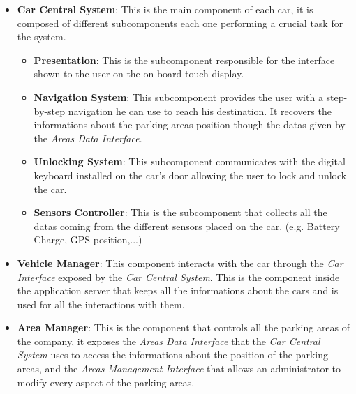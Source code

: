 \begin{itemize}
	\item \textbf{Car Central System}: This is the main component of each car,
																		 it is composed of different subcomponents
																		 each one performing a crucial task for the
																		 system.

	\begin{itemize}
	\item \textbf{Presentation}: This is the subcomponent responsible for the
															 interface shown to the user on the on-board touch
															 display.
	\item \textbf{Navigation System}: This subcomponent provides the user with a
																		step-by-step navigation he can use to reach
																		his destination. It recovers the
																		informations about the parking areas
																		position though the datas given by the
																		\textit{Areas Data Interface}.
	\item \textbf{Unlocking System}: This subcomponent communicates with the
																	 digital keyboard installed on the car's door
																	 allowing the user to lock and unlock the car.
	\item \textbf{Sensors Controller}: This is the subcomponent that collects all
																		 the datas coming from the different sensors
																		 placed on the car. (e.g. Battery Charge, GPS
																		 position,...)

	\end{itemize}

	\item \textbf{Vehicle Manager}: This component interacts with the car through
																	the \textit{Car Interface} exposed by the
																	\textit{Car Central System}. This is the
																	component inside the application server that
																	keeps all the informations about the cars and
																	is used for all the interactions with them.
	\item \textbf{Area Manager}: This is the component that controls all the
															 parking areas of the company, it exposes the
															 \textit{Areas Data Interface} that the
															 \textit{Car Central System} uses to access the
															 informations about the position of the parking
															 areas, and the
															 \textit{Areas Management Interface} that allows
															 an administrator to modify every aspect of the
															 parking areas.
\end{itemize}


